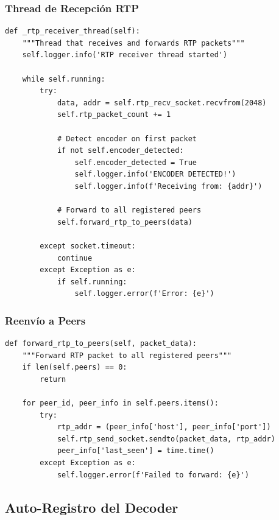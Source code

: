 \documentclass[12pt,a4paper]{article}
\begin{document}
\subsubsection{Thread de Recepción RTP}

\begin{lstlisting}[style=pythonstyle, caption={Thread receptor de RTP}, label={lst:rtpthread}]
def _rtp_receiver_thread(self):
    """Thread that receives and forwards RTP packets"""
    self.logger.info('RTP receiver thread started')
    
    while self.running:
        try:
            data, addr = self.rtp_recv_socket.recvfrom(2048)
            self.rtp_packet_count += 1
            
            # Detect encoder on first packet
            if not self.encoder_detected:
                self.encoder_detected = True
                self.logger.info('ENCODER DETECTED!')
                self.logger.info(f'Receiving from: {addr}')
            
            # Forward to all registered peers
            self.forward_rtp_to_peers(data)
            
        except socket.timeout:
            continue
        except Exception as e:
            if self.running:
                self.logger.error(f'Error: {e}')
\end{lstlisting}

\subsubsection{Reenvío a Peers}

\begin{lstlisting}[style=pythonstyle, caption={Método de reenvío}, label={lst:forward}]
def forward_rtp_to_peers(self, packet_data):
    """Forward RTP packet to all registered peers"""
    if len(self.peers) == 0:
        return
    
    for peer_id, peer_info in self.peers.items():
        try:
            rtp_addr = (peer_info['host'], peer_info['port'])
            self.rtp_send_socket.sendto(packet_data, rtp_addr)
            peer_info['last_seen'] = time.time()
        except Exception as e:
            self.logger.error(f'Failed to forward: {e}')
\end{lstlisting}

\subsection{Auto-Registro del Decoder}
\end{document}
